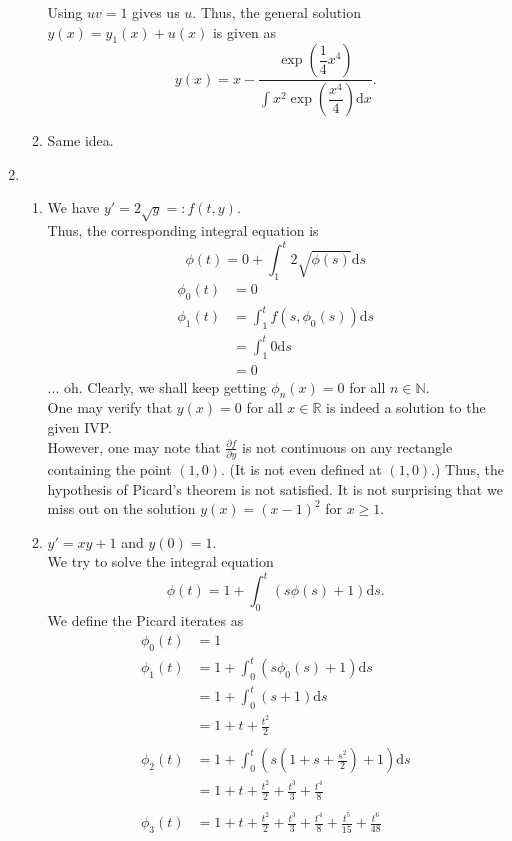 \documentclass[12pt]{article}
\theoremstyle{definition}
\numberwithin{thm}{section}
\begin{document}
\begin{enumerate}[leftmargin=*, label = Q.\arabic*.]
\begin{enumerate}[label = (\roman*)]
		Using $uv = 1$ gives us $u.$ Thus, the general solution $y(x) = y_1(x) + u(x)$ is given as
		\[y(x) = x - \dfrac{\exp\left(\dfrac{1}{4}x^4\right)}{\displaystyle\int x^2\exp\left(\dfrac{x^4}{4}\right) \text{d}x}.\]
		\item Same idea.
	\end{enumerate}
	\item 
	\begin{enumerate}[label = (\roman*)] 
		\item We have $y' = 2\sqrt{y} =: f(t, y).$\\
		Thus, the corresponding integral equation is
		\[\phi(t) = 0 + \int_{1}^{t} 2\sqrt{\phi(s)} \text{d}s\]
		\begin{align*} 
			\phi_0(t) &= 0\\
			\phi_1(t) &= \int_{1}^{t} f(s, \phi_0(s)) \text{d}s\\
			&= \int_{1}^{t} 0 \text{d}s\\
			&= 0
		\end{align*}
		... oh. Clearly, we shall keep getting $\phi_n(x) = 0$ for all $n \in \mathbb{N}.$\\
		One may verify that $y(x) = 0$ for all $x \in \mathbb{R}$ is indeed a solution to the given IVP.\\
		However, one may note that $\frac{\partial f}{\partial y}$ is not continuous on any rectangle containing the point $(1, 0).$ (It is not even defined at $(1, 0)$.) Thus, the hypothesis of Picard's theorem is not satisfied. It is not surprising that we miss out on the solution $y(x) = (x - 1)^2$ for $x \ge 1.$
		\item $y' = xy + 1$ and $y(0) = 1.$\\
		We try to solve the integral equation
		\[\phi(t) = 1 + \int_{0}^{t} (s\phi(s) + 1) \text{d}s.\]
		We define the Picard iterates as
		\begin{align*} 
			\phi_0(t) &= 1\\
			\phi_1(t) &= 1 + \int_{0}^{t} (s\phi_0(s) + 1) \text{d}s\\
			&= 1 + \int_{0}^{t} (s + 1) \text{d}s\\
			&= 1 + t + \frac{t^2}{2}\\~\\
			\phi_2(t) &= 1 + \int_{0}^{t} \left(s\left(1 + s + \frac{s^2}{2}\right) + 1\right) \text{d}s\\
			&= 1 + t + \frac{t^2}{2} + \frac{t^3}{3} + \frac{t^4}{8}\\~\\
			\phi_3(t) &= 1 + t + \frac{t^2}{2} + \frac{t^3}{3} + \frac{t^4}{8} + \frac{t^5}{15} + \frac{t^6}{48}\\

\end{align*}
\end{enumerate}
\end{enumerate}
\end{document}
